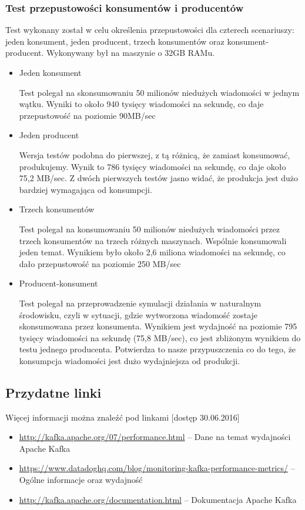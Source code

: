 \documentclass[a4paper,12pt]{article}
\begin{document}
\subsubsection{Test przepustowości konsumentów i producentów}
Test wykonany został w celu określenia przepustowości dla czterech scenariuszy: jeden konsument, jeden producent, trzech konsumentów oraz konsument-producent. Wykonywany był na maszynie o 32GB RAMu.
\begin{itemize}
\item Jeden konsument 


Test polegał na skonsumowaniu 50 milionów niedużych wiadomości w jednym wątku. Wyniki to około 940 tysięcy wiadomości na sekundę, co daje przepustowość na poziomie 90MB/sec
\item Jeden producent

Wersja testów podobna do pierwszej, z tą różnicą, że zamiast konsumować, produkujemy. Wynik to 786 tysięcy wiadomości na sekundę, co daje około 75,2 MB/sec. Z dwóch pierwszych testów jasno widać, że produkcja jest dużo bardziej wymagająca od konsumpcji. 
\item Trzech konsumentów

Test polegał na konsumowaniu 50 milionów niedużych wiadomości przez trzech konsumentów na trzech różnych maszynach. Wspólnie konsumowali jeden temat. Wynikiem było około 2,6 miliona wiadomości na sekundę, co dało przepustowość na poziomie 250 MB/sec
\item Producent-konsument

Test polegał na przeprowadzenie symulacji działania w naturalnym środowisku, czyli w sytuacji, gdzie wytworzona wiadomość zostaje skonsumowana przez konsumenta. Wynikiem jest wydajność na poziomie 795 tysięcy wiadomości na sekundę (75,8 MB/sec), co jest zbliżonym wynikiem do testu jednego producenta. Potwierdza to nasze przypuszczenia co do tego, że konsumpcja wiadomości jest dużo wydajniejsza od produkcji.
\end{itemize}
\subsection{Przydatne linki}
Więcej informacji można znaleźć pod linkami [dostęp 30.06.2016]
\begin{itemize}
\item \url{http://kafka.apache.org/07/performance.html} -- Dane na temat wydajności Apache Kafka
\item \url{https://www.datadoghq.com/blog/monitoring-kafka-performance-metrics/} -- Ogólne informacje oraz wydajność
\item \url{http://kafka.apache.org/documentation.html} -- Dokumentacja Apache Kafka
\end{itemize}
\end{document}
